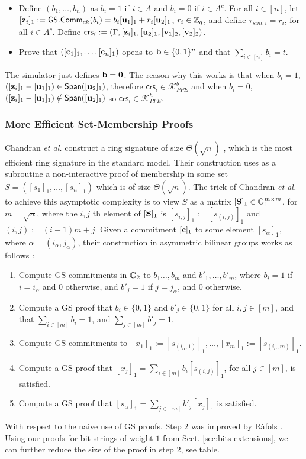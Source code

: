 \begin{itemize}
\item Define $(b_1,\ldots,b_n)$ as $b_i=1$
if $i \in A$ and $b_i=0$ if $i \in A^c$. For all $i \in [n]$, let $[\mathbf{z}_i]_1:=\mathsf{GS.Comm}_{ck}(b_i)=b_i [\mathbf{u}_1]_1+ r_i [\mathbf{u}_2]_1$, $r_i \in \mathbb{Z}_q$, and define $\tau_{sim,i}=r_i$, for all $i \in A^c$. Define $\mathsf{crs}_i:=(\Gamma,[\mathbf{z}_i]_1,[\mathbf{u}_2]_1,[\mathbf{v}_1]_2,[\mathbf{v}_2]_2)$. 
\item Prove that $([\mathbf{c}_1]_1,\ldots,[\mathbf{c}_n]_1)$ opens to $\mathbf{b} \in \{0,1\}^{n}$ and that $\sum_{i\in[n]} b_i=t$.
\end{itemize}
The simulator just defines $\mathbf{b}=\mathbf{0}$. The reason why this works is that when $b_i=1$, $([\mathbf{z}_i]_1-[\mathbf{u}_1]_1) \in \mathsf{Span}( [\mathbf{u}_2]_1)$, therefore $\mathsf{crs}_i \in \mathcal{K}^{b}_{PPE}$ and when
$b_i=0$,  $([\mathbf{z}_i]_1-[\mathbf{u}_1]_1) \notin \mathsf{Span}( [\mathbf{u}_2]_1)$ so $\mathsf{crs}_i \in \mathcal{K}^{h}_{PPE}$.

\subsubsection{More Efficient Set-Membership Proofs} Chandran \textit{et al.} construct a ring signature of size $\Theta(\sqrt{n})$ \cite{ICALP:ChaGroSah07}, which is the most efficient ring signature in the standard model. Their construction uses as a subroutine a non-interactive proof of membership in some set $S=([s_1]_1,\ldots,[s_n]_1)$ which is of size $\Theta(\sqrt{n})$.  The trick of Chandran \textit{et al.} to achieve this asymptotic complexity is to view $S$ as a matrix $[\mathbf{{S}}]_1\in\mathbb{G}_1^{m\times m}$, for $m=\sqrt{n}$, where the $i,j$ th element of $[\mathbf{{S}}]_1$ is $[s_{i,j}]_1 := [s_{(i,j)}]_1$ and $(i,j):=(i-1)m+j$. Given a commitment $[\mathbf{c}]_1$ to some element $[s_{\alpha}]_1$, where $\alpha = (i_\alpha,j_\alpha)$, their construction in asymmetric bilinear groups works as follows :
\begin{enumerate}
\item Compute GS commitments in $\mathbb{G}_2$ to $b_1\ldots,b_m$ and $b'_1,\ldots,b'_m$,
      where $b_i = 1$ if $i=i_\alpha$ and $0$ otherwise, and $b'_{j}=1$ if $j=j_\alpha$, and $0$ otherwise.
\item Compute a GS proof that $b_i \in \{0,1\}$ and $b'_j \in \{0,1\}$ for all $i,j\in[m]$, and that $\sum_{i\in[m]}b_i=1$, and $\sum_{j\in[m]}b'_j=1$.
\item Compute GS commitments to $[x_1]_1:=[s_{(i_\alpha,1)}]_1,\ldots,[x_m]_1:=[s_{(i_\alpha,m)}]_1$.
\item Compute a GS proof that $[x_j]_1 = \sum_{i\in[m]}b_i[s_{(i,j)}]_1$, for all $j\in[m]$, is satisfied. 
\item Compute a GS proof that $[s_{\alpha}]_1 = \sum_{j\in[m]}b'_j[x_j]_1$ is satisfied.
\end{enumerate}
With respect to the naive use of GS proofs, Step $2$ was improved by R\`afols \cite{TCC:Rafols15}.  Using our proofs for bit-strings of weight $1$ from Sect. \ref{sec:bits-extensions}, we can further reduce the size of the proof in step 2, 
see table.

